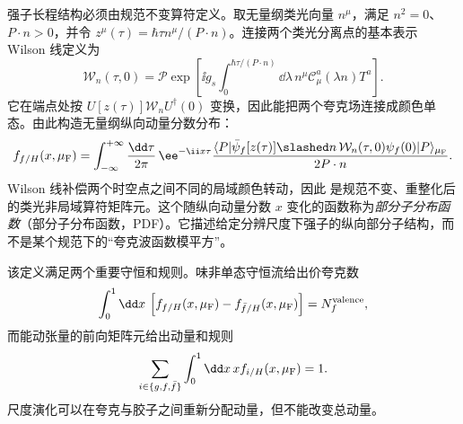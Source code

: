 强子长程结构必须由规范不变算符定义。取无量纲类光向量 $n^\mu$，满足 $n^2=0$、$P\cdot n>0$，并令 $z^\mu(\tau)=\hbar\tau n^\mu/(P\cdot n)$。连接两个类光分离点的基本表示 Wilson 线定义为
\begin{equation}
 {
 \mathcal W_n(\tau,0)
 =\mathcal P\exp\!\left[
 \ii g_s\int_0^{\hbar\tau/(P\cdot n)}\dd\lambda\,
 n^\mu\mathscr C_\mu^a(\lambda n)T^a
 \right].}
 \label{eq:dis-lightlike-wilson-line-dp68}
\end{equation}
它在端点处按 $U[z(\tau)]\mathcal W_nU^\dagger(0)$ 变换，因此能把两个夸克场连接成颜色单态。由此构造无量纲纵向动量分数分布：
\begin{equation}
 {
 f_{f/H}(x,\mu_{\rm F})
 =\int_{-\infty}^{+\infty}\frac{\dd\tau}{2\pi}\,
 \ee^{-\ii x\tau}
 \frac{\langle P|\bar\psi_f[z(\tau)]\slashed n\,
 \mathcal W_n(\tau,0)\psi_f(0)|P\rangle_{\mu_{\rm F}}}{2P\cdot n}.}
 \label{eq:pdf-operator-definition-dp14}
\end{equation}
Wilson 线补偿两个时空点之间不同的局域颜色转动，因此 是规范不变、重整化后的类光非局域算符矩阵元。这个随纵向动量分数 $x$ 变化的函数称为\emph{部分子分布函数}（部分子分布函数，PDF）。它描述给定分辨尺度下强子的纵向部分子结构，而不是某个规范下的“夸克波函数模平方”。

该定义满足两个重要守恒和规则。味非单态守恒流给出价夸克数
\begin{equation}
 {
 \int_0^1\dd x\,
 \left[f_{f/H}(x,\mu_{\rm F})-f_{\bar f/H}(x,\mu_{\rm F})\right]
 =N_f^{\rm valence},}
 \label{eq:pdf-valence-sum-rule-dp13}
\end{equation}
而能动张量的前向矩阵元给出动量和规则
\begin{equation}
 {
 \sum_{i\in\{g,f,\bar f\}}
 \int_0^1\dd x\,x f_{i/H}(x,\mu_{\rm F})=1.}
 \label{eq:pdf-momentum-sum-rule-dp13}
\end{equation}
尺度演化可以在夸克与胶子之间重新分配动量，但不能改变总动量。

